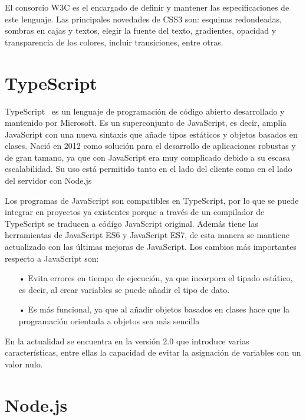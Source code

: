 \documentclass[a4paper, 12pt]{book}
\begin{document}
El consorcio W3C es el encargado de definir y mantener las especificaciones de este lenguaje. 
Las principales novedades de CSS3 son: esquinas redondeadas, sombras en cajas y textos, elegir la fuente del texto, gradientes, opacidad y transparencia de los colores, incluir transiciones, entre otras.

\section{TypeScript} 
\label{sec:TypeScript}

TypeScript~\cite{Pagina_de_typescript} es un lenguaje de programación de código abierto desarrollado y mantenido por Microsoft. 
Es un superconjunto de JavaScript, es decir, amplía JavaScript con una nueva sintaxis que añade tipos estáticos y objetos basados en clases. 
Nació en 2012 como solución para el desarrollo de aplicaciones  robustas y de gran tamano, ya que con JavaScript era muy complicado debido a su escasa escalabilidad. 
Su uso está permitido tanto en el lado del cliente como en el lado del servidor con Node.js

 Los programas de JavaScript son compatibles en TypeScript, por lo que se puede integrar en proyectos ya existentes porque a través de un compilador de TypeScript se traducen a código JavaScript original. 
 Además tiene las herramientas de JavaScript ES6 y JavaScript ES7, de esta manera se mantiene actualizado con las últimas mejoras de JavaScript. 
Los cambios más importantes respecto a JavaScript son:

\begin{itemize}
	\item[•] Evita errores en tiempo de ejecución, ya que incorpora el tipado estático, es decir, al crear variables se puede añadir el tipo de dato.
	
	\item[•] Es más funcional, ya que al añadir objetos basados en clases hace que la programación orientada a objetos sea más sencilla
\end{itemize}

En la actualidad se encuentra en la versión 2.0 que introduce varias características, entre ellas la capacidad de evitar la asignación de variables con un valor nulo. 

\section{Node.js} 
\label{sec:Node}
\end{document}

